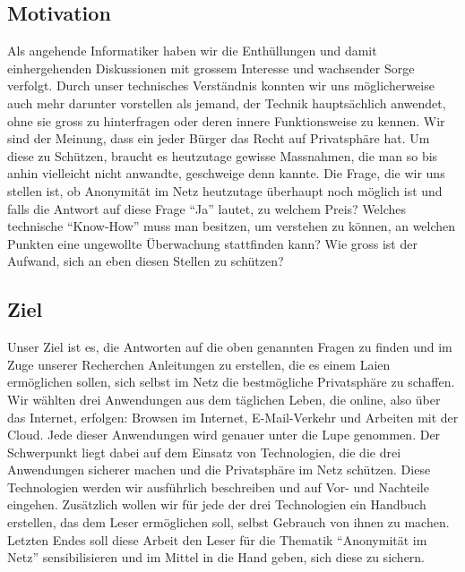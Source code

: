 \subsection{Motivation}
Als angehende Informatiker haben wir die Enthüllungen und damit einhergehenden Diskussionen mit grossem Interesse und wachsender Sorge verfolgt. Durch unser technisches Verständnis konnten wir uns möglicherweise auch mehr darunter vorstellen als jemand, der Technik hauptsächlich anwendet, ohne sie gross zu hinterfragen oder deren innere Funktionsweise zu kennen. Wir sind der Meinung, dass ein jeder Bürger das Recht auf Privatsphäre hat. Um diese zu Schützen, braucht es heutzutage gewisse Massnahmen, die man so bis anhin vielleicht nicht anwandte, geschweige denn kannte. Die Frage, die wir uns stellen ist, ob Anonymität im Netz heutzutage überhaupt noch möglich ist und falls die Antwort auf diese Frage ``Ja'' lautet, zu welchem Preis? Welches technische ``Know-How'' muss man besitzen, um verstehen zu können, an welchen Punkten eine ungewollte Überwachung stattfinden kann? Wie gross ist der Aufwand, sich an eben diesen Stellen zu schützen? 


\subsection{Ziel}
Unser Ziel ist es, die Antworten auf die oben genannten Fragen zu finden und im Zuge unserer Recherchen Anleitungen zu erstellen, die es einem Laien ermöglichen sollen, sich selbst im Netz die bestmögliche Privatsphäre zu schaffen. Wir wählten drei Anwendungen aus dem täglichen Leben, die online, also über das Internet, erfolgen: Browsen im Internet, E-Mail-Verkehr und Arbeiten mit der Cloud. Jede dieser Anwendungen wird genauer unter die Lupe genommen. Der Schwerpunkt liegt dabei auf dem Einsatz von Technologien, die die drei Anwendungen sicherer machen und die Privatsphäre im Netz schützen. Diese Technologien werden wir ausführlich beschreiben und auf Vor- und Nachteile eingehen. Zusätzlich wollen wir für jede der drei Technologien ein Handbuch erstellen, das dem Leser ermöglichen soll, selbst Gebrauch von ihnen zu machen. Letzten Endes soll diese Arbeit den Leser für die Thematik ``Anonymität im Netz'' sensibilisieren und im Mittel in die Hand geben, sich diese zu sichern.
